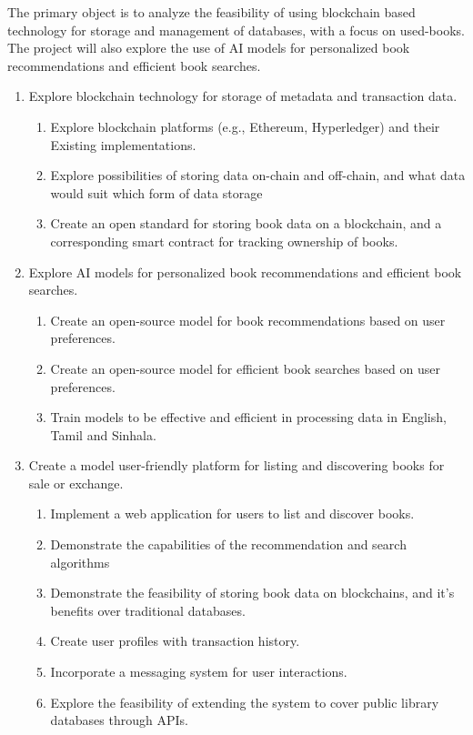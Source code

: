 The primary object is to analyze the feasibility of using blockchain based
technology for storage and management of databases, with a focus on used-books.
The project will also explore the use of AI models for personalized book
recommendations and efficient book searches.

\begin{enumerate}
  \item Explore blockchain technology for storage of metadata and transaction data.
        \begin{enumerate}
          \item Explore blockchain platforms (e.g., Ethereum, Hyperledger) and their Existing
                implementations.
          \item Explore possibilities of storing data on-chain and off-chain, and what data
                would suit which form of data storage
          \item Create an open standard for storing book data on a blockchain, and a
                corresponding smart contract for tracking ownership of books.
        \end{enumerate}
  \item Explore AI models for personalized book recommendations and efficient book
        searches.
        \begin{enumerate}
          \item Create an open-source model for book recommendations based on user
                preferences.
          \item Create an open-source model for efficient book searches based on user
                preferences.
          \item Train models to be effective and efficient in processing data in English,
                Tamil and Sinhala.
        \end{enumerate}
  \item Create a model user-friendly platform for listing and discovering books for sale or
        exchange.
        \begin{enumerate}
          \item Implement a web application for users to list and discover books.
          \item Demonstrate the capabilities of the recommendation and search algorithms
          \item Demonstrate the feasibility of storing book data on blockchains, and it's
                benefits over traditional databases.

          \item Create user profiles with transaction history.
          \item Incorporate a messaging system for user interactions.
          \item Explore the feasibility of extending the system to cover public library databases
                through APIs.
        \end{enumerate}
\end{enumerate}
